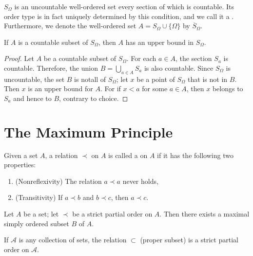     \begin{remark}
        $S_{\Omega}$ is an uncountable well-ordered set every section of which is countable. Its order type is in fact uniquely determined by this condition, and we call it a . Furthermore, we denote the well-ordered set $A = S_{\Omega}\cup\{\Omega\}$ by $\overline{S}_{\Omega}$.
    \end{remark}

    \begin{theorem}
        If $A$ is a countable subset of $S_{\Omega}$, then $A$ has an upper bound in $S_{\Omega}$.
    \end{theorem}
    \begin{proof}
        Let $A$ be a countable subset of $S_{\Omega}$. For each $a \in A$, the section $S_a$ is countable. Therefore, the union $B = \bigcup_{a\in A}S_a$ is also countable. Since $S_{\Omega}$ is uncountable, the set $B$ is notall of $S_{\Omega}$; let $x$ be a point of $S_{\Omega}$ that is not in $B$. Then $x$ is an upper bound for $A$. For if $x < a$ for some $a \in A$, then $x$ belongs to $S_a$ and hence to $B$, contrary to choice.
    \end{proof}


    \section{The Maximum Principle}

    \begin{definition}
        Given a set $A$, a relation $\prec$ on $A$ is called a  on $A$ if it has the following two properties: \begin{enumerate}
            \item (Nonreflexivity) The relation $a \prec a$ never holds,
            \item (Transitivity) If $a \prec b$ and $b \prec c$, then $a \prec c$.
        \end{enumerate}
    \end{definition}

    \begin{theorem}
        Let $A$ be a set; let $\prec$ be a strict partial order on $A$. Then there exists a maximal simply ordered subset $B$ of $A$.
    \end{theorem}


    \begin{example}
        If $\mathscr{A}$ is any collection of sets, the relation $\subset$ (proper subset) is a strict partial order on $\mathscr{A}$. 
    \end{example}

